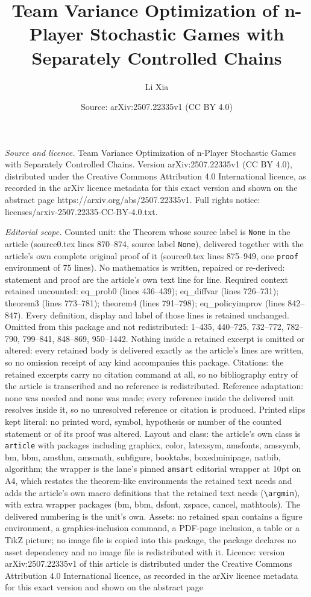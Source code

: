 \documentclass[10pt,a4paper]{amsart}
\title[Team Variance Optimization of n-Player Stochastic Games with]{Team Variance Optimization of n-Player Stochastic Games with Separately Controlled Chains}
\author{Li Xia}
\date{Source: arXiv:2507.22335v1 (CC BY 4.0)}
\begin{document}
\maketitle

\noindent\emph{Source and licence.} Team Variance Optimization of n-Player Stochastic Games with Separately Controlled Chains. Version arXiv:2507.22335v1 (CC BY 4.0), distributed under the Creative Commons Attribution 4.0 International licence, as recorded in the arXiv licence metadata for this exact version and shown on the abstract page https://arxiv.org/abs/2507.22335v1. Full rights notice: licenses/arxiv-2507.22335-CC-BY-4.0.txt.\par\smallskip

\noindent\textit{Editorial scope.} Counted unit: the Theorem whose source label is \texttt{None} in the article (source0.tex lines 870--874, source label \texttt{None}), delivered together with the article's own complete original proof of it (source0.tex lines 875--949, one \texttt{proof} environment of 75 lines). No mathematics is written, repaired or re-derived: statement and proof are the article's own text line for line. Required context retained uncounted: eq\_prob0 (lines 436--439); eq\_diffvar (lines 726--731); theorem3 (lines 773--781); theorem4 (lines 791--798); eq\_policyimprov (lines 842--847). Every definition, display and label of those lines is retained unchanged. Omitted from this package and not redistributed: 1--435, 440--725, 732--772, 782--790, 799--841, 848--869, 950--1442. Nothing inside a retained excerpt is omitted or altered: every retained body is delivered exactly as the article's lines are written, so no omission receipt of any kind accompanies this package. Citations: the retained excerpts carry no citation command at all, so no bibliography entry of the article is transcribed and no reference is redistributed. Reference adaptation: none was needed and none was made; every reference inside the delivered unit resolves inside it, so no unresolved reference or citation is produced. Printed slips kept literal: no printed word, symbol, hypothesis or number of the counted statement or of its proof was altered. Layout and class: the article's own class is \texttt{article} with packages including graphicx, color, latexsym, amsfonts, amssymb, bm, bbm, amsthm, amsmath, subfigure, booktabs, boxedminipage, natbib, algorithm; the wrapper is the lane's pinned \texttt{amsart} editorial wrapper at 10pt on A4, which restates the theorem-like environments the retained text needs and adds the article's own macro definitions that the retained text needs (\texttt{\textbackslash argmin}), with extra wrapper packages (bm, bbm, dsfont, xspace, cancel, mathtools). The delivered numbering is the unit's own. Assets: no retained span contains a figure environment, a graphics-inclusion command, a PDF-page inclusion, a table or a TikZ picture; no image file is copied into this package, the package declares no asset dependency and no image file is redistributed with it. Licence: version arXiv:2507.22335v1 of this article is distributed under the Creative Commons Attribution 4.0 International licence, as recorded in the arXiv licence metadata for this exact version and shown on the abstract page 
\end{document}
